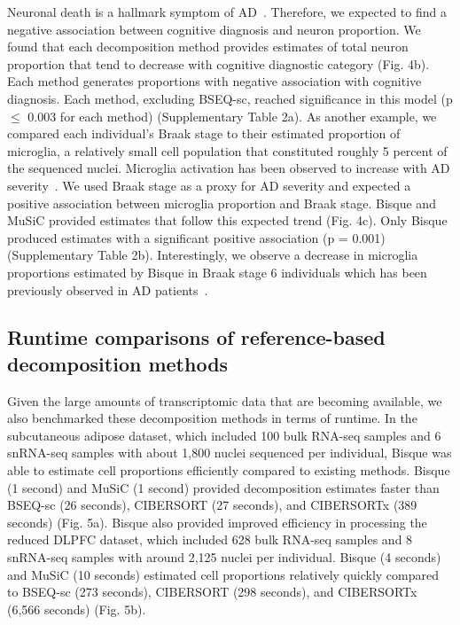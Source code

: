 Neuronal death is a hallmark symptom of AD~\cite{Yankner1996-lk}. Therefore, we expected to find a negative association between cognitive diagnosis and neuron proportion. We found that each decomposition method provides estimates of total neuron proportion that tend to decrease with cognitive diagnostic category (Fig. 4b). Each method generates proportions with negative association with cognitive diagnosis. Each method, excluding BSEQ-sc, reached significance in this model (p $\leq$ 0.003 for each method) (Supplementary Table 2a). As another example, we compared each individual’s Braak stage to their estimated proportion of microglia, a relatively small cell population that constituted roughly 5 percent of the sequenced nuclei. Microglia activation has been observed to increase with AD severity~\cite{Hansen2018-jj}. We used Braak stage as a proxy for AD severity and expected a positive association between microglia proportion and Braak stage. Bisque and MuSiC provided estimates that follow this expected trend (Fig. 4c). Only Bisque produced estimates with a significant positive association (p = 0.001) (Supplementary Table 2b). Interestingly, we observe a decrease in microglia proportions estimated by Bisque in Braak stage 6 individuals which has been previously observed in AD patients~\cite{Navarro2018-ti}.

\subsection{Runtime comparisons of reference-based decomposition methods}

Given the large amounts of transcriptomic data that are becoming available, we also benchmarked these decomposition methods in terms of runtime. In the subcutaneous adipose dataset, which included 100 bulk RNA-seq samples and 6 snRNA-seq samples with about 1,800 nuclei sequenced per individual, Bisque was able to estimate cell proportions efficiently compared to existing methods. Bisque (1 second) and MuSiC (1 second) provided decomposition estimates faster than BSEQ-sc (26 seconds), CIBERSORT (27 seconds), and CIBERSORTx (389 seconds) (Fig. 5a).  Bisque also provided improved efficiency in processing the reduced DLPFC dataset, which included 628 bulk RNA-seq samples and 8 snRNA-seq samples with around 2,125 nuclei per individual. Bisque (4 seconds) and MuSiC (10 seconds) estimated cell proportions relatively quickly compared to BSEQ-sc (273 seconds), CIBERSORT (298 seconds), and CIBERSORTx (6,566 seconds) (Fig. 5b). 

